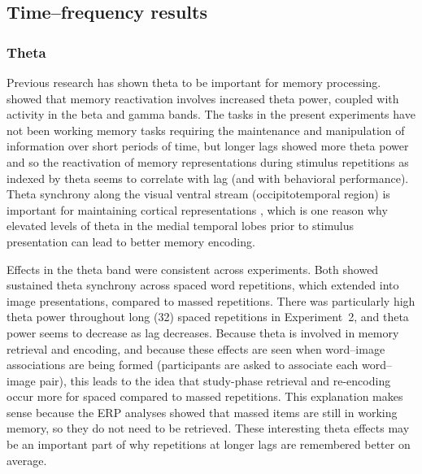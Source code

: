\subsection{Time--frequency results}

\subsubsection{Theta}

Previous research has shown theta to be important for memory processing.
 showed that memory reactivation involves increased theta power, coupled with activity in the beta and gamma bands.
The tasks in the present experiments have not been working memory tasks requiring the maintenance and manipulation of information over short periods of time, but longer lags showed more theta power and so the reactivation of memory representations during stimulus repetitions as indexed by theta seems to correlate with lag (and with behavioral performance).
Theta synchrony along the visual ventral stream (occipitotemporal region) is important for maintaining cortical representations \cite{DuzeEtal2010}, which is one reason why elevated levels of theta in the medial temporal lobes prior to stimulus presentation can lead to better memory encoding.

Effects in the theta band were consistent across experiments.  Both showed sustained theta synchrony across spaced word repetitions, which extended into image presentations, compared to massed repetitions.  There was particularly high theta power throughout long (32) spaced repetitions in Experiment~2, and theta power seems to decrease as lag decreases.
Because theta is involved in memory retrieval and encoding, and because these effects are seen when word--image associations are being formed (participants are asked to associate each word--image pair), this leads to the idea that study-phase retrieval and re-encoding occur more for spaced compared to massed repetitions.  This explanation makes sense because the ERP analyses showed that massed items are still in working memory, so they do not need to be retrieved.
These interesting theta effects may be an important part of why repetitions at longer lags are remembered better on average.


